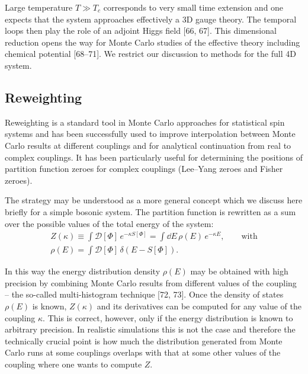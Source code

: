 Large temperature $T \gg T_c$ corresponds to very small time extension and one
expects that the system approaches effectively a 3D gauge theory. The temporal
loops then play the role of an adjoint Higgs field [66, 67]. This dimensional
reduction opens the way for Monte Carlo studies of the effective theory
including chemical potential [68--71]. We restrict our discussion to methods
for the full 4D system.

\subsection{Reweighting}

Reweighting is a standard tool in Monte Carlo approaches for statistical spin
systems and has been successfully used to improve interpolation between Monte
Carlo results at different couplings and for analytical continuation from real
to complex couplings. It has been particularly useful for determining the
positions of partition function zeroes for complex couplings (Lee--Yang zeroes
and Fisher zeroes).

The strategy may be understood as a more general concept which we discuss here
briefly for a simple bosonic system. The partition function is rewritten as a
sum over the possible values of the total energy of the system:
\begin{equation}
\begin{split}
  Z(\kappa) \equiv \int \mathcal{D}[\Phi]\,e^{-\kappa S[\Phi]}
    = \int\dd E\,\rho(E)\,e^{-\kappa E},
  \qquad \text{with} \\
  \rho(E) = \int \mathcal{D}[\Phi]\,\delta(E - S[\Phi]).
\end{split}
\end{equation}

In this way the energy distribution density $\rho(E)$ may be obtained with
high precision by combining Monte Carlo results from different values of the
coupling -- the so-called multi-histogram technique [72, 73]. Once the density
of states $\rho(E)$ is known, $Z(\kappa)$ and its derivatives can be computed
for any value of the coupling $\kappa$. This is correct, however, only if the
energy distribution is known to arbitrary precision. In realistic simulations
this is not the case and therefore the technically crucial point is how much
the distribution generated from Monte Carlo runs at some couplings overlaps
with that at some other values of the coupling where one wants to compute $Z$.

